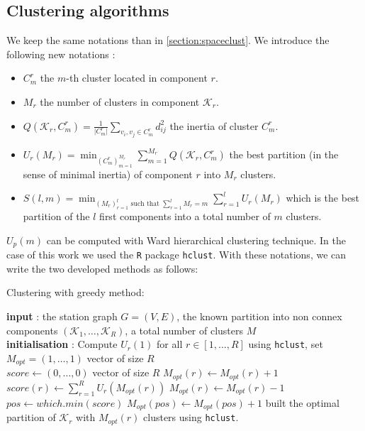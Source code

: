 \begin{appendices}
\section{Clustering algorithms}\label{app:clustalgo:chap5}

We keep the same notations than in \ref{section:spaceclust}. We introduce the following new notations : 
\begin{itemize}
    \item $C_m^r$ the $m$-th cluster located in component $r$.
    \item $M_r$ the number of clusters in component $\mathcal{K}_r$.
    \item $\displaystyle Q(\mathcal{K}_r,C_m^r) = \frac{1}{\lvert C_m^r\rvert}\sum_{v_i,v_j \in C_m^r}d_{ij}^2$ the inertia of cluster $C^r_m$.
    \item $\displaystyle U_r(M_r) = \min_{(C_m^r)_{m=1}^{M_r}}\sum_{m = 1}^{M_r}Q(\mathcal{K}_r,C_m^r)$ the best partition (in the sense of minimal inertia) of component $r$ into $M_r$ clusters. 
    \item $\displaystyle S(l,m) = \min_{(M_r)_{r=1}^l \text{ such that } \sum_{r=1}^l M_r = m}\sum_{r=1}^lU_r(M_r)$ which is the best partition of the $l$ first components into a total number of $m$ clusters.
\end{itemize}

$U_p(m)$ can be computed with Ward hierarchical clustering technique. In the case of this work we used the \texttt{R} package \texttt{hclust}. With these notations, we can write the two developed methods as follows: 

\begin{algorithm}[ht]
\caption{Clustering with greedy method:}\label{algo:greed}
\begin{algorithmic}

\State \textbf{input} : the station graph $G=(V,E)$, the known partition into non connex components $(\mathcal{K}_1,\dots,\mathcal{K}_R)$, a total number of clusters $M$ \\
  
\State \textbf{initialisation} : Compute $U_r(1)$ for all $r \in [1,\dots,R]$ using \texttt{hclust}, set $M_{opt} = (1,\dots,1)$ vector of size $R$  \\

  \State $\textit{score}\gets(0,\dots,0)$ vector of size $R$
  \State $M_{opt}(r) \gets M_{opt}(r) + 1$
  \State $\textit{score}(r) \gets \sum_{r=1}^R U_r(M_{opt}(r))$
  \State $M_{opt}(r) \gets M_{opt}(r) - 1$
  \EndFor
  \State $\textit{pos} \gets which.min(\textit{score})$
  \State $M_{opt}(pos) \gets M_{opt}(pos)+1$
\EndFor
{}
\State built the optimal partition of $\mathcal{K}_r$ with $M_{opt}(r)$ clusters using \texttt{hclust}.
\EndFor


\end{algorithmic}
\end{algorithm}
\end{appendices}
